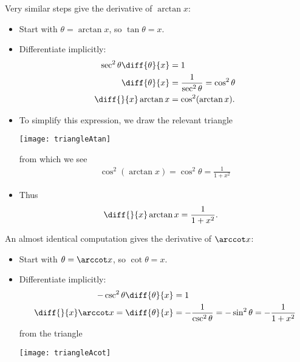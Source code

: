 \begin{eg}\label{eg_2_12_2}
Very similar steps give the derivative of $\arctan x$:
\begin{itemize}
 \item Start with $\theta = \arctan x$, so $\tan \theta = x$.
\item Differentiate implicitly:
  \begin{align*}
  \sec^2 \theta \diff{\theta}{x} &= 1 \\
  \diff{\theta}{x} &= \frac{1}{\sec^2 \theta} = \cos^2 \theta\\
  \diff{}{x}\arctan x &= \cos^2(\arctan x).
\end{align*}
\item To simplify this expression, we draw the relevant triangle
\begin{efig}
\begin{center}
  \texttt{[image: triangleAtan]}
\end{center}
\end{efig}
from which we see
\begin{align*}
\cos^2(\arctan x) = \cos^2\theta = \frac{1}{1+x^2}
\end{align*}
\item Thus
\begin{align*}
  \diff{}{x}\arctan x &= \frac{1}{1+x^2}.
\end{align*}
\end{itemize}
An almost identical computation gives the derivative of $\arccot x$:
\begin{itemize}
 \item Start with $\theta = \arccot x$, so $\cot \theta = x$.
\item Differentiate implicitly:
  \begin{align*}
  -\csc^2 \theta \diff{\theta}{x} &= 1 \\
\diff{}{x}\arccot x =
  \diff{\theta}{x} &= -\frac{1}{\csc^2 \theta} = -\sin^2 \theta
                      =-\frac{1}{1+x^2}
\end{align*}
 from the triangle
\begin{efig}
\begin{center}
  \texttt{[image: triangleAcot]}
\end{center}
\end{efig}
\end{itemize}
\end{eg}




